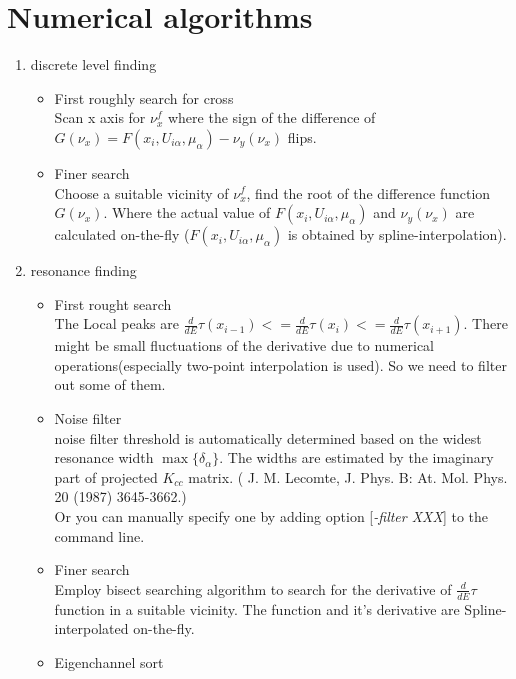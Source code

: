 \documentclass[11pt]{article}
\begin{document}
\section{\label{sec:numerical}Numerical algorithms}
\begin{enumerate}
\item discrete level finding
\begin{itemize}
	\item  First roughly search for cross\\
	Scan x axis for $\nu_x^{f}$ where the sign of the difference of $G(\nu_x) = F({x_i},{U_{i\alpha},\mu_\alpha}) - \nu_y(\nu_x)$ flips. 
	\item  Finer search\\
	Choose a suitable vicinity of $\nu_x^{f}$, find the root of the difference function $G(\nu_x)$. Where the actual value of  $F({x_i},{U_{i\alpha},\mu_\alpha})$ and $\nu_y(\nu_x)$ are calculated on-the-fly ($F({x_i},{U_{i\alpha},\mu_\alpha})$ is obtained by spline-interpolation).  
\end{itemize}
\item resonance finding
\begin{itemize}
	\item First rought search\\ 
	The Local peaks are  $\frac{d}{dE}\tau(x_{i-1}) <=\frac{d}{dE}\tau(x_{i})<=\frac{d}{dE}\tau(x_{i+1})$. There might be small fluctuations of the derivative due to numerical operations(especially two-point interpolation is used). So we need to filter out some of them.
	\item Noise filter\\
	    noise filter threshold is automatically determined based on the widest resonance width $\max\{\delta_{\alpha}\}$. The widths are  estimated by the imaginary part of projected $K_{cc}$ matrix. ( J. M. Lecomte, J. Phys. B: At. Mol. Phys. 20 (1987) 3645-3662.)\\
	    Or you can manually specify one by adding option [\emph{-filter XXX}] to the command line. 
	\item Finer search\\
	    Employ bisect searching algorithm to search for the derivative of  $\frac{d}{dE}\tau$ function in a suitable vicinity. The function and it's derivative are Spline-interpolated on-the-fly.
	\item Eigenchannel sort
\end{itemize}
\end{enumerate} 
\end{document}
